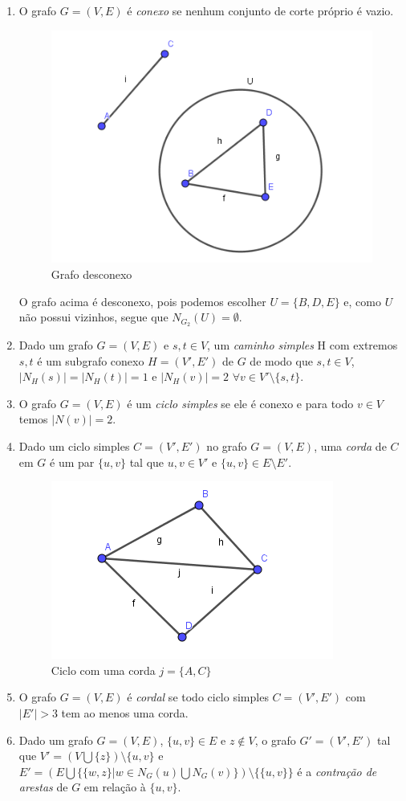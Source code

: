 \documentclass[a4paper,12pt]{article}
\begin{document}
\begin{enumerate}
		\item O grafo $G=(V,E)$ é \textit{conexo} se nenhum conjunto de corte próprio é vazio.
		\begin{figure}[H]
			\includegraphics[width=0.6\linewidth]{desconexo.png}
			\caption{Grafo desconexo}
			\label{}
		\end{figure}
		O grafo acima é desconexo, pois podemos escolher $U=\{B,D,E\}$ e, como $U$ não possui vizinhos, segue que $N_{G_2}(U)=\emptyset$.
		\item Dado um grafo $G=(V,E)$ e $s,t\in V$, um \textit{caminho simples} H com extremos $s,t$ é um subgrafo conexo $H=(V',E')$ de $G$ de modo que $s,t \in V$, $|N_H(s)|=|N_H(t)|=1$ e $|N_H(v)|=2$ $\forall v\in V'\setminus\{s,t\}$.
		\item O grafo $G=(V,E)$ é um \textit{ciclo simples} se ele é conexo e para todo $v\in V$ temos $|N(v)|=2$.
		\item Dado um ciclo simples $C=(V',E')$ no grafo $G=(V,E)$, uma \textit{corda} de $C$ em $G$ é um par $\{u,v\}$ tal que $u,v\in V'$ e $\{u,v\}\in E\setminus E'$.
		\begin{figure}[H]
			\includegraphics[width=0.6\linewidth]{corda.png}
			\caption{Ciclo com uma corda $j=\{A,C\}$}
			\label{}
		\end{figure}
		\item O grafo $G=(V,E)$ é \textit{cordal} se todo ciclo simples $C=(V',E')$ com $|E'|>3$ tem ao menos uma corda. 
		\item Dado um grafo $G=(V,E)$, $\{u,v\}\in E$ e $z\nin V$, o grafo $G'=(V',E')$ tal que $V'=(V\bigcup\{z\})\setminus \{u,v\}$ e $E'=(E\bigcup\{\{w,z\}|w\in N_G(u)\bigcup N_G(v)\})\setminus\{\{u,v\}\}$ é a \textit{contração de arestas} de $G$ em relação à $\{u,v\}$.

\end{enumerate}
\end{document}
